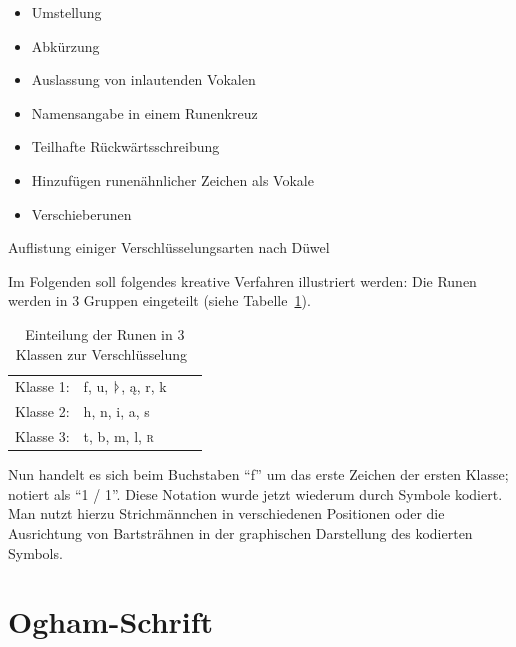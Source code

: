 \documentclass[a4paper]{scrartcl}
\begin{document}
\begin{table}[!t]
  \begin{minipage}{0.5\textwidth}
    \begin{itemize}
      \item Umstellung
      \item Abkürzung
      \item Auslassung von inlautenden Vokalen
      \item Namensangabe in einem Runenkreuz
    \end{itemize}
  \end{minipage}
  \begin{minipage}{0.5\textwidth}
    \begin{itemize}
      \item Teilhafte Rückwärtsschreibung
      \item Hinzufügen runenähnlicher Zeichen als Vokale
      \item Verschieberunen
    \end{itemize}
  \end{minipage}
  \caption{Auflistung einiger Verschlüsselungsarten nach Düwel~\cite[S. 182]{düwel}}
  \label{tab:encodings}
\end{table}

Im Folgenden soll folgendes kreative Verfahren illustriert werden: Die Runen werden in 3 Gruppen eingeteilt (siehe Tabelle~\ref{tab:encode}).

\begin{table}[!t]
  \begin{center}
    \begin{tabular}{clll}
      Klasse 1: & f, u, {\runicfont ᚦ}, {\runicfont ą}, r, k \\
      Klasse 2: & h, n, i, a, s \\
      Klasse 3: & t, b, m, l, \textsc{r}
    \end{tabular}
    \caption{Einteilung der Runen in 3 Klassen zur Verschlüsselung~\cite[S. 183]{düwel}}
    \label{tab:encode}
  \end{center}
\end{table}

Nun handelt es sich beim Buchstaben \enquote{f} um das erste Zeichen der ersten Klasse; notiert als \enquote{1 / 1}. Diese Notation wurde jetzt wiederum durch Symbole kodiert. Man nutzt hierzu Strichmännchen in verschiedenen Positionen oder die Ausrichtung von Bartsträhnen in der graphischen Darstellung des kodierten Symbols.

\section{Ogham-Schrift}
\end{document}
